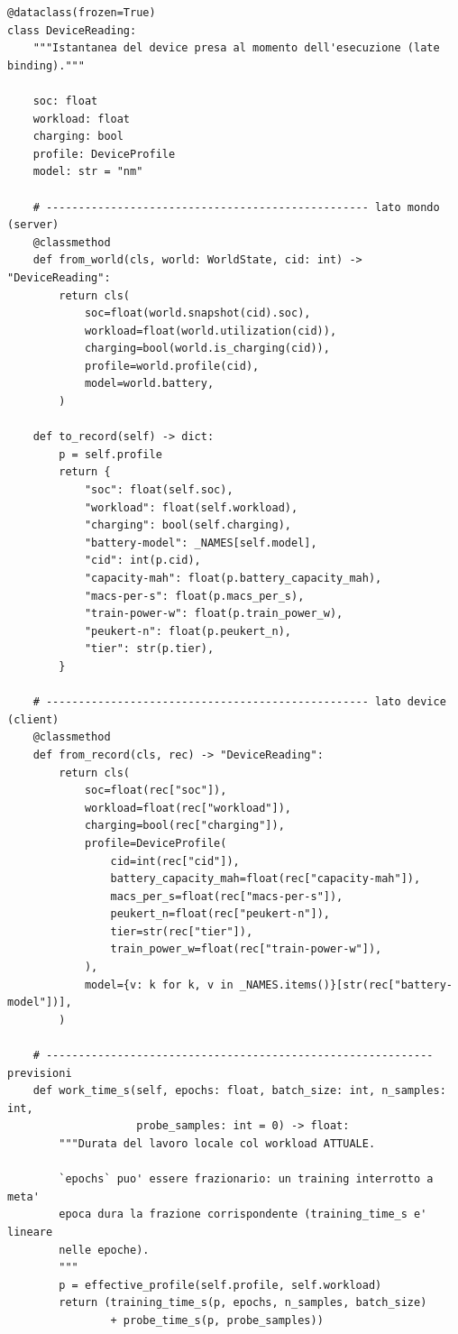 \documentclass[11pt,a4paper]{article}
\begin{document}
\begin{lstlisting}[style=py,firstnumber=41,caption={\texttt{tesifl/device/fuel\_gauge.py}, lines 41--130}]
@dataclass(frozen=True)
class DeviceReading:
    """Istantanea del device presa al momento dell'esecuzione (late binding)."""

    soc: float
    workload: float
    charging: bool
    profile: DeviceProfile
    model: str = "nm"

    # -------------------------------------------------- lato mondo (server)
    @classmethod
    def from_world(cls, world: WorldState, cid: int) -> "DeviceReading":
        return cls(
            soc=float(world.snapshot(cid).soc),
            workload=float(world.utilization(cid)),
            charging=bool(world.is_charging(cid)),
            profile=world.profile(cid),
            model=world.battery,
        )

    def to_record(self) -> dict:
        p = self.profile
        return {
            "soc": float(self.soc),
            "workload": float(self.workload),
            "charging": bool(self.charging),
            "battery-model": _NAMES[self.model],
            "cid": int(p.cid),
            "capacity-mah": float(p.battery_capacity_mah),
            "macs-per-s": float(p.macs_per_s),
            "train-power-w": float(p.train_power_w),
            "peukert-n": float(p.peukert_n),
            "tier": str(p.tier),
        }

    # -------------------------------------------------- lato device (client)
    @classmethod
    def from_record(cls, rec) -> "DeviceReading":
        return cls(
            soc=float(rec["soc"]),
            workload=float(rec["workload"]),
            charging=bool(rec["charging"]),
            profile=DeviceProfile(
                cid=int(rec["cid"]),
                battery_capacity_mah=float(rec["capacity-mah"]),
                macs_per_s=float(rec["macs-per-s"]),
                peukert_n=float(rec["peukert-n"]),
                tier=str(rec["tier"]),
                train_power_w=float(rec["train-power-w"]),
            ),
            model={v: k for k, v in _NAMES.items()}[str(rec["battery-model"])],
        )

    # ------------------------------------------------------------ previsioni
    def work_time_s(self, epochs: float, batch_size: int, n_samples: int,
                    probe_samples: int = 0) -> float:
        """Durata del lavoro locale col workload ATTUALE.

        `epochs` puo' essere frazionario: un training interrotto a meta'
        epoca dura la frazione corrispondente (training_time_s e' lineare
        nelle epoche).
        """
        p = effective_profile(self.profile, self.workload)
        return (training_time_s(p, epochs, n_samples, batch_size)
                + probe_time_s(p, probe_samples))


\end{lstlisting}
\end{document}
